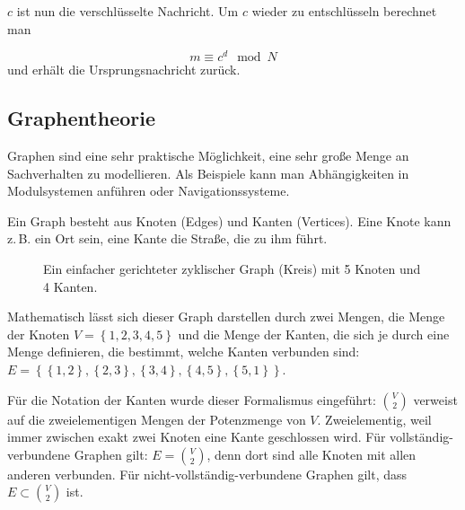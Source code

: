 \documentclass{scrartcl}
\begin{document}
$c$ ist nun die verschlüsselte Nachricht. Um $c$ wieder zu entschlüsseln berechnet man

\begin{equation}
	m \equiv c^d \mod N
\end{equation}
und erhält die Ursprungsnachricht zurück.


\subsection{Graphentheorie}

Graphen sind eine sehr praktische Möglichkeit, eine sehr große Menge an Sachverhalten zu modellieren. Als Beispiele kann man Abhängigkeiten in 
Modulsystemen anführen oder Navigationssysteme.

Ein Graph besteht aus Knoten (Edges) und Kanten (Vertices). Eine Knote kann z.\,B. ein Ort sein, eine Kante die Straße, die zu ihm führt.

\begin{figure}[h!]
	\centering
	\caption{Ein einfacher gerichteter zyklischer Graph (Kreis) mit 5 Knoten und 4 Kanten.}
\end{figure}

Mathematisch lässt sich dieser Graph darstellen durch zwei Mengen, die Menge der Knoten $V = \left\{1, 2, 3, 4, 5\right\}$ und die
Menge der Kanten, die sich je durch eine Menge definieren, die bestimmt, welche Kanten verbunden sind: 
$E = \left\{\left\{1, 2\right\}, \left\{2, 3\right\}, \left\{3, 4\right\}, \left\{4, 5\right\}, \left\{5, 1\right\}\right\}$.

Für die Notation der Kanten wurde dieser Formalismus eingeführt: $\binom{V}{2}$ verweist auf die zweielementigen Mengen der Potenzmenge
von $V$. Zweielementig, weil immer zwischen exakt zwei Knoten eine Kante geschlossen wird. Für vollständig-verbundene Graphen gilt:
$E = \binom{V}{2}$, denn dort sind alle Knoten mit allen anderen verbunden. Für nicht-vollständig-verbundene Graphen gilt, dass
$E \subset \binom{V}{2}$ ist.
\end{document}
